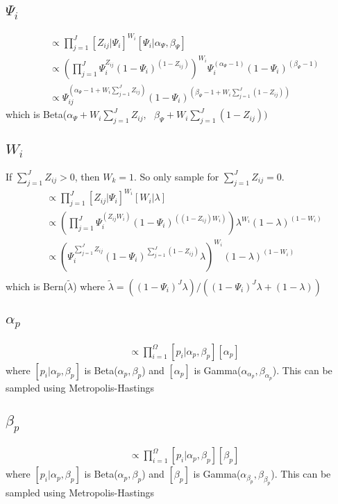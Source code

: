 \documentclass[fleqn]{article}
\begin{document}
\subsection{$\Psi_i$}
%
\begin{align*}
  [\Psi_i | \cdot] & \propto \prod_{j = 1}^J [Z_{ij} | \Psi_i]^{W_i} [\Psi_i | \alpha_\Psi, \beta_\Psi]\\
  & \propto  \left(  \prod_{j = 1}^J  \Psi_{i}^{Z_{ij}} (1 - \Psi_i)^{(1 - Z_{ij})} \right) ^{W_i} \Psi_i^{(\alpha_\Psi - 1)} (1 - \Psi_i)^{(\beta_\Psi - 1)}\\
  & \propto \Psi_{ij}^{(\alpha_\Psi - 1 + W_i \sum_{j = 1}^J Z_{ij})} (1 - \Psi_i)^{(\beta_\Psi - 1 + W_i \sum_{j = 1}^J (1 - Z_{ij}))}
\end{align*}
which is Beta($\alpha_\Psi + W_i \sum_{j = 1}^J Z_{ij}, \mbox{ } \beta_\Psi + W_i \sum_{j = 1}^J (1 - Z_{ij}))$
%
%
%
\subsection{$W_i$}
%
If $\sum_{j = 1}^J Z_{ij} > 0$, then $W_k=1$.  So only sample for $\sum_{j = 1}^J Z_{ij} = 0$.
%
\begin{align*}
  [W_i | \cdot] & \propto \prod_{j = 1}^J [Z_{ij} | \Psi_i]^{W_i} [W_i | \lambda]\\
  & \propto \left( \prod_{j = 1}^J \Psi_i^{(Z_{ij} W_i)} (1 - \Psi_i)^{\left( (1 - Z_{ij}) W_i \right)} \right) \lambda^{W_i} (1 - \lambda)^{(1 - W_i)}\\
  & \propto  \left(  \Psi_i^{\sum_{j = 1}^J Z_{ij} } (1 - \Psi_i)^{\sum_{j = 1}^J(1 - Z_{ij})} \lambda \right)^{W_i} (1 - \lambda)^{(1 - W_i)}\\
\end{align*}
%
which is Bern($\tilde{\lambda}$) where $\tilde{\lambda} = \left((1 - \Psi_i)^J  \lambda \right) / \left( (1 - \Psi_i)^J  \lambda + (1 - \lambda) \right)$
%
%
%
\subsection{$\alpha_p$}
%
\begin{align*}
  [\alpha_p | \cdot] & \propto \prod_{i = 1}^\Omega [p_i | \alpha_p, \beta_p] [\alpha_p]
\end{align*}
where $[p_i | \alpha_p, \beta_p]$ is Beta($\alpha_p, \beta_p$) and $[\alpha_p]$ is Gamma($\alpha_{\alpha_p}, \beta_{\alpha_p}$). This can be sampled using Metropolis-Hastings
%
%
%
\subsection{$\beta_p$}
%
\begin{align*}
  [\beta_p | \cdot] & \propto \prod_{i = 1}^\Omega [p_i | \alpha_p, \beta_p] [\beta_p] 
\end{align*}
where $[p_i | \alpha_p, \beta_p]$ is Beta($\alpha_p, \beta_p$) and $[\beta_p]$ is Gamma($\alpha_{\beta_p}, \beta_{\beta_p}$). This can be sampled using Metropolis-Hastings
%
%
%
\end{document}
